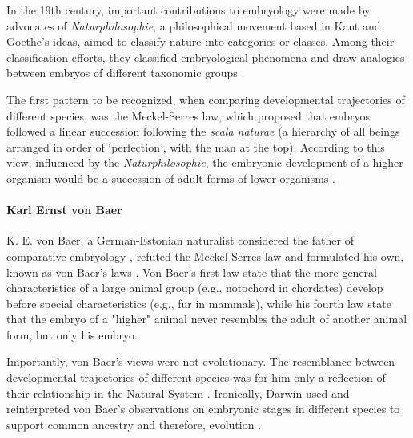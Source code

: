 \begin{mdframed}[style=boxstyle,frametitle={Box2. Haeckel, von Baer and the \textit{Naturphilosophie}}]\label{Box2:Naturphilosophie}

In the 19th century, important contributions to embryology were made by advocates of \textit{Naturphilosophie}, a philosophical movement based in Kant and Goethe's ideas, aimed to classify nature into categories or classes.
Among their classification efforts, they classified embryological phenomena and draw analogies between embryos of different taxonomic groups \citep{Horder2010,Ghiselin2005}.

The first pattern to be recognized, when comparing developmental trajectories of different species, was the Meckel-Serres law,
  which proposed that embryos followed a linear succession following the \textit{scala naturae} (a hierarchy of all beings arranged in order of `perfection', with the man at the top).
According to this view, influenced by the \textit{Naturphilosophie}, the embryonic development of a higher organism would be a succession of adult forms of lower organisms \citep{Russell1916,amundson2005changing}.

\paragraph{Karl Ernst von Baer} \label{vonBaer}
K. E. von Baer, a German-Estonian naturalist considered the father of comparative embryology \citep{Russell1916}, refuted the Meckel-Serres law and formulated his own, known as von Baer's laws \citep{vonBaer1828uber}. 
Von Baer's first law state that the more general characteristics of a large animal group (e.g., notochord in chordates) develop before special characteristics (e.g., fur in mammals), while his fourth law state that the embryo of a "higher" animal never resembles the adult of another animal form, but only his embryo. 

Importantly, von Baer's views were not evolutionary. The resemblance between developmental trajectories of different species was for him only a reflection of their relationship in the Natural System \citep{amundson2005changing}.
Ironically, Darwin used and reinterpreted von Baer's observations on embryonic stages in different species to support common ancestry and therefore, evolution \citep{darwin1859origin}.


\end{mdframed}

